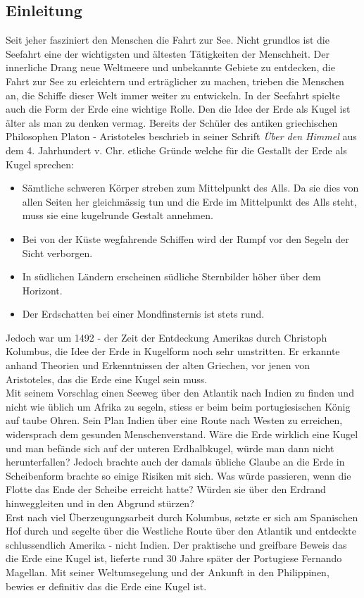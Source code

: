 \begin{refsection}
\begin{refsection}
\section{Einleitung}
Seit jeher fasziniert den Menschen die Fahrt zur See. Nicht grundlos ist die Seefahrt eine der wichtigsten und ältesten Tätigkeiten der Menschheit. Der innerliche Drang neue Weltmeere und unbekannte Gebiete zu entdecken, die Fahrt zur See zu erleichtern und erträglicher zu machen, trieben die Menschen an, die Schiffe dieser Welt immer weiter zu entwickeln.
In der Seefahrt spielte auch die Form der Erde eine wichtige Rolle. Den die Idee der Erde als Kugel ist älter als man zu denken vermag. Bereits der Schüler des antiken griechischen Philosophen Platon - Aristoteles beschrieb in seiner Schrift \textit{Über den Himmel} aus dem 4. Jahrhundert v. Chr. etliche Gründe welche für die Gestallt der Erde als Kugel sprechen:
\begin{itemize}
      \item Sämtliche schweren Körper streben zum Mittelpunkt des Alls. Da sie dies von allen Seiten her gleichmässig tun und die Erde im Mittelpunkt des Alls steht, muss sie eine kugelrunde Gestalt annehmen. 
\item Bei von der Küste wegfahrende Schiffen wird der Rumpf vor den Segeln der Sicht verborgen. 
\item In südlichen Ländern erscheinen südliche Sternbilder höher über dem Horizont.
\item Der Erdschatten bei einer Mondfinsternis ist stets rund.
\end{itemize}

Jedoch war um 1492 - der Zeit der Entdeckung Amerikas durch Christoph Kolumbus, die Idee der Erde in Kugelform noch sehr umstritten. Er erkannte anhand Theorien und Erkenntnissen der alten Griechen, vor jenen von Aristoteles, das die Erde eine Kugel sein muss. \\
Mit seinem Vorschlag einen Seeweg über den Atlantik nach Indien zu finden und nicht wie üblich um Afrika zu segeln, stiess er beim beim portugiesischen König auf taube Ohren. Sein Plan Indien über eine Route nach Westen zu erreichen, widersprach dem gesunden Menschenverstand. Wäre die Erde wirklich eine Kugel und man befände sich auf der unteren Erdhalbkugel, würde man dann nicht herunterfallen? Jedoch brachte auch der damals übliche Glaube an die Erde in Scheibenform brachte so einige Risiken mit sich. Was würde passieren, wenn die Flotte das Ende der Scheibe erreicht hatte? Würden sie über den Erdrand hinweggleiten und in den Abgrund stürzen?\\
Erst nach viel Überzeugungsarbeit durch Kolumbus, setzte er sich am Spanischen Hof durch und segelte über die Westliche Route über den Atlantik und entdeckte schlussendlich Amerika - nicht Indien.
Der praktische und greifbare Beweis das die Erde eine Kugel ist, lieferte rund 30 Jahre später der Portugiese Fernando Magellan. Mit seiner Weltumsegelung und der Ankunft in den Philippinen, bewies er definitiv das die Erde eine Kugel ist.\\


\end{refsection}
\end{refsection}
